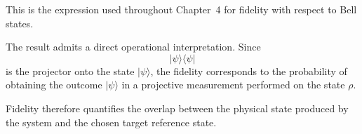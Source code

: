 This is the expression used throughout Chapter~4 for fidelity with respect to Bell states.

\medskip

The result admits a direct operational interpretation. Since
\[
|\psi\rangle\langle\psi|
\]
is the projector onto the state \( |\psi\rangle \), the fidelity corresponds to the probability of obtaining the outcome \( |\psi\rangle \) in a projective measurement performed on the state \( \rho \).

\medskip

Fidelity therefore quantifies the overlap between the physical state produced by the system and the chosen target reference state.